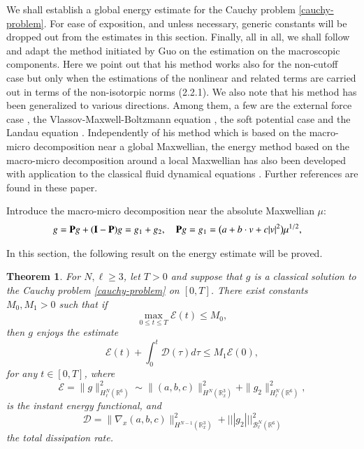 \documentclass{amsart}[12pt, article]
\newtheorem{theo}{Theorem}[section]
\begin{document}
We shall establish a global energy estimate for the Cauchy problem
\eqref{cauchy-problem}. For ease of exposition, and unless necessary, generic constants will be dropped out {}from the estimates in this section. Finally, all in all, we shall follow and adapt the method initiated by Guo \cite{guo-1} on the estimation on the
macroscopic components. Here we point out
that his method works also for the non-cutoff case 
but only when the estimations of the nonlinear and related terms are carried out
in terms of the non-isotorpic norms (2.2.1). We also note that his  method 
has been generalized to various  directions. Among them, a few are 
  the external force case \cite{duan,duan-ukai-yang}, the Vlassov-Maxwell-Boltzmann equation
\cite{strain}, the soft potential case \cite{strain-guo,h-yu} and the Landau equation \cite{guo,h-yu}.
Independently of his method which is based on the macro-micro decomposition near a global Maxwellian,
the energy method based on the macro-micro decomposition around a local Maxwellian
has
also been developed with application to the classical fluid dynamical equations 
\cite{liu-1,liu-2,liu-yang-yu-zhao}. Further references are found in 
these paper.

Introduce the macro-micro  decomposition near the absolute Maxwellian $\mu$:
\begin{align*}
g&={{\bf P}} g+({{\bf I}}-{{\bf P}})g=g_1+g_2,
\quad
{{\bf P}} g =g_1= \big(a+ b\cdot v+ c| v|^2 \big) \mu^{1/2},
\end{align*}

In this section, the following result on the energy estimate will be proved.
\begin{theo}\label{aprioriestimate}
For $N,\ell\ge 3$, let $T>0$ and suppose that
$g$ is a classical solution to the Cauchy problem \eqref{cauchy-problem} on $[0, T]$.
There exist constants $M_0, M_1>0$ such that
if
\[
\max_{0\le t\le T}\mathcal{E}(t)\le M_0,
\]
then  $g$ enjoys  the estimate
\[
\mathcal{E}(t)+
\int_0^t\mathcal{D}(\tau)d\tau\le M_1 \mathcal{E}(0),
\]
for any $t\in[0,T]$, where
\begin{equation*}
\mathcal{E}=\| g\|^2_{H^N_\ell({{{\mathbb R}}}^6)}\sim\|(a,b,c)\|_{H^N({{{\mathbb R}}}^3_x)}^2
+\| g_2\|^2_{H^N_\ell({{{\mathbb R}}}^6)},
\end{equation*}
is the  instant energy functional, and
\[
\mathcal{D}=\|\nabla_x(a,b,c)\|_{H^{N-1}({{{\mathbb R}}}^3_x)}^2
+||| g_2|||^2_{{{\mathcal B}}^N_\ell({{{\mathbb R}}}^6)}
\]
the total dissipation rate.
\end{theo}
\end{document}
